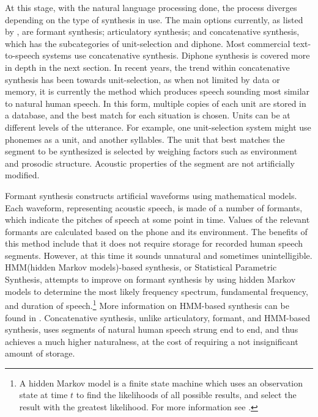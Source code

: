 \documentclass[12pt]{article}
\begin{document}
	At this stage, with the natural language processing done, the process diverges depending on the type of synthesis in use. The main options currently, as listed by \citet{slp}, are formant synthesis; articulatory synthesis; and concatenative synthesis, which has the subcategories of unit-selection and diphone. Most commercial text-to-speech systems use concatenative synthesis. Diphone synthesis is covered more in depth in the next section. In recent years, the trend within concatenative synthesis has been towards unit-selection, as when not limited by data or memory, it is currently the method which produces speech sounding most similar to natural human speech. In this form, multiple copies of each unit are stored in a database, and the best match for each situation is chosen. Units can be at different levels of the utterance. For example, one unit-selection system might use phonemes as a unit, and another syllables. The unit that best matches the segment to be synthesized is selected by weighing factors such as environment and prosodic structure. Acoustic properties of the segment are not artificially modified. \par

	Formant synthesis constructs artificial waveforms using mathematical models. Each waveform, representing acoustic speech, is made of a number of formants, which indicate the pitches of speech at some point in time. Values of the relevant formants are calculated based on the phone and its environment. The benefits of this method include that it does not require storage for recorded human speech segments. However, at this time it sounds unnatural and sometimes unintelligible. HMM(hidden Markov models)-based synthesis, or Statistical Parametric Synthesis, attempts to improve on formant synthesis by using hidden Markov models to determine the most likely frequency spectrum, fundamental frequency, and duration of speech.\footnote{A hidden Markov model is a finite state machine which uses an observation state at time $t$ to find the likelihoods of all possible results, and select the result with the greatest likelihood. For more information see \citet{hmm}.} More information on HMM-based synthesis can be found in \citet{hmm_intro}. Concatenative synthesis, unlike articulatory, formant, and HMM-based synthesis, uses segments of natural human speech strung end to end, and thus achieves a much higher naturalness, at the cost of requiring a not insignificant amount of storage. \par

	\clearpage
\end{document}
